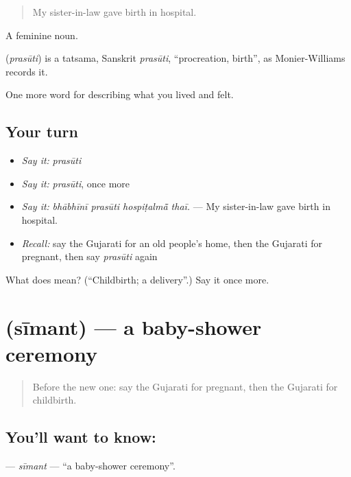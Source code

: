 \begin{quote}
My sister-in-law gave birth in hospital.
\end{quote}

A feminine noun.

\begin{cousinweb}
\textbf{} (\emph{prasūti}) is a tatsama, Sanskrit \emph{prasūti}, \textquotedblleft{}procreation, birth\textquotedblright{}, as Monier-Williams records it.
\end{cousinweb}

\begin{grammarlens}[title={What you've built}]
One more word for describing what you lived and felt.
\end{grammarlens}

\subsection*{Your turn}
\begin{itemize}
\raggedright
  \item \emph{Say it:} \emph{prasūti}
  \item \emph{Say it:} \emph{prasūti}, once more
  \item \emph{Say it:} \emph{bhābhīnī prasūti hospiṭalmā̃ thaī.} — My sister-in-law gave birth in hospital.
  \item \emph{Recall:} say the Gujarati for an old people's home, then the Gujarati for pregnant, then say \emph{prasūti} again
\end{itemize}

\begin{tcolorbox}[breakable,colback=teal!4,colframe=teal!35!black,title={Before you move on}]
What does  mean? (\textquotedblleft{}Childbirth; a delivery\textquotedblright{}.) Say it once more.
\end{tcolorbox}
\section[\texorpdfstring{\gu{સીમંત} (sīmant)}{સીમંત (sīmant)}]{ (sīmant) — a baby-shower ceremony}

\label{lesson:GU-C495-simant}



\begin{quote}
Before the new one: say the Gujarati for pregnant, then the Gujarati for childbirth.
\end{quote}

\subsection*{You'll want to know: }
\textbf{} — \emph{sīmant} — \textquotedblleft{}a baby-shower ceremony\textquotedblright{}.

